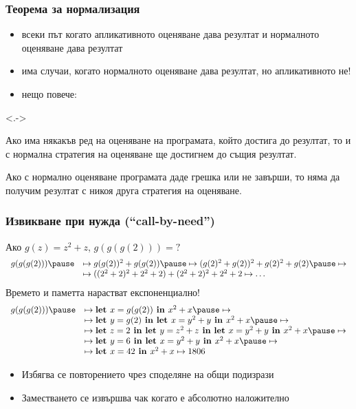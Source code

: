 \documentclass[alsotrans,beameroptions={aspectratio=169}]{beamerswitch}
\begin{document}
\begin{frame}
  \frametitle{Теорема за нормализация}

  \begin{itemize}[<+->]
  \item всеки път когато апликативното оценяване дава резултат и нормалното оценяване дава резултат
  \item има случаи, когато нормалното оценяване дава резултат, но апликативното не!
  \item нещо повече:
  \end{itemize}
  \onslide<.->
  \begin{theorem}
    Ако има някакъв ред на оценяване на програмата, който достига до резултат, то и с нормална стратегия на оценяване ще достигнем до същия резултат.
  \end{theorem}
  \onslide<+->
  \begin{corollary}
    Ако с нормално оценяване програмата даде грешка или не завърши, то няма да получим резултат с \alert{никоя друга стратегия на оценяване}.
  \end{corollary}
\end{frame}

\begin{frame}
  \frametitle{Извикване при нужда (``call-by-need'')}

Ако $g(z) = z^2 + z$, $g(g(g(2))) = ?$
\pause
{\small
\begin{equation*}
  \begin{array}{rl}
  g(g(g(2))) \pause &\mapsto g(g(2))^2 + g(g(2)) \pause\mapsto (g(2)^2+ g(2))^2 + g(2)^2 + g(2) \pause\mapsto\\
  &\mapsto ((2^2+2)^2+2^2+2)+(2^2+2)^2 + 2^2+2 \mapsto \ldots
  \end{array}
\end{equation*}}\pause
Времето и паметта нарастват експоненциално!\\
\pause
{}
\pause
{\small
\begin{equation*}
  \begin{array}{rl}
    g(g(g(2))) \pause &\mapsto \lett{x = g(g(2))}{x^2 + x}\pause \mapsto\\
    &\mapsto \lett{y=g(2)}{\lett{x=y^2+y}{x^2 + x}} \pause \mapsto\\
    &\mapsto \lett{z=2}{\lett{y=z^2+z}{\lett{x=y^2+y}{x^2 + x}}} \pause \mapsto\\
    &\mapsto \lett{y=6}{\lett{x = y^2+y}{x^2 + x}} \pause \mapsto\\
    &\mapsto \lett{x=42}{x^2 + x} \mapsto 1806
  \end{array}
\end{equation*}}\pause\vspace{-1.5em}
\begin{itemize}[<+->]
\item Избягва се повторението чрез споделяне на общи подизрази
\item Заместването се извършва чак когато е \alert{абсолютно наложително}
\end{itemize}
\end{frame}
\end{document}
